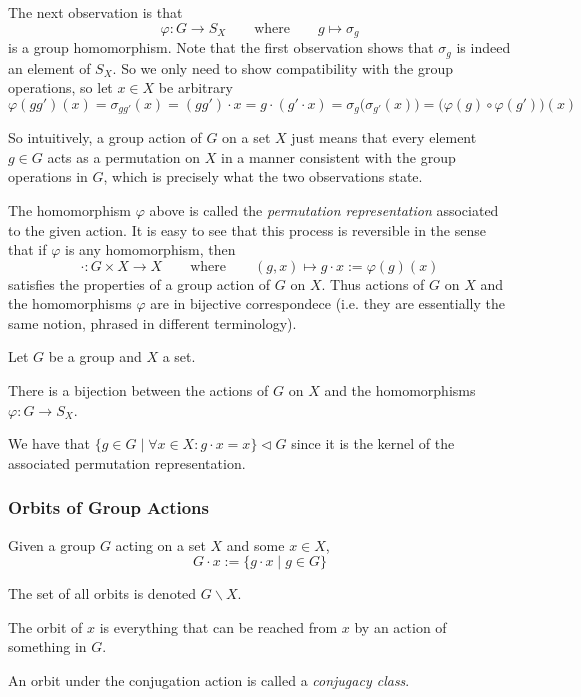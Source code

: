 The next observation is that
\[\varphi: G \to S_X \qquad\text{where}\qquad g \mapsto \sigma_g\]
is a group homomorphism.
Note that the first observation shows that \(\sigma_g\) is indeed an element of \(S_X\).
So we only need to show compatibility with the group operations, so let \(x \in X\) be arbitrary
\[\varphi(gg')(x) = \sigma_{gg'}(x) = (gg') \cdot x = g \cdot (g' \cdot x) = \sigma_g\big(\sigma_{g'}(x)\big) = \big(\varphi(g) \circ \varphi(g')\big)(x)\]

So intuitively, a group action of \(G\) on a set \(X\) just means that every element \(g \in G\) acts as a permutation on \(X\) in a manner consistent with the group operations in \(G\), which is precisely what the two observations state.

The homomorphism \(\varphi\) above is called the \emph{permutation representation} associated to the given action.
It is easy to see that this process is reversible in the sense that if \(\varphi\) is any homomorphism, then
\[\cdot: G \times X \to X \qquad\text{where}\qquad (g, x) \mapsto g \cdot x := \varphi(g)(x)\]
satisfies the properties of a group action of \(G\) on \(X\).
Thus actions of \(G\) on \(X\) and the homomorphisms \(\varphi\) are in bijective correspondece (i.e. they are essentially the same notion, phrased in different terminology).

\begin{proposition}
   Let \(G\) be a group and \(X\) a set.

   There is a bijection between the actions of \(G\) on \(X\) and the homomorphisms \(\varphi: G \to S_X\).
\end{proposition}
\begin{remark}
   We have that \(\{g \in G \mid \forall x \in X: g \cdot x = x\} \triangleleft G\) since it is the kernel of the associated permutation representation.
\end{remark}

\subsubsection{Orbits of Group Actions}
\begin{definition}[Orbit]
   Given a group \(G\) acting on a set \(X\) and some \(x \in X\),
   \[G \cdot x := \{g \cdot x \mid g \in G\}\]
\end{definition}
\begin{remark}[Notation]
   The set of all orbits is denoted \(G\backslash X\).
\end{remark}
\begin{remark}[Intuition]
   The orbit of \(x\) is everything that can be reached from \(x\) by an action of something in \(G\).
\end{remark}
\begin{remark}
   An orbit under the conjugation action is called a \emph{conjugacy class}.
\end{remark}

